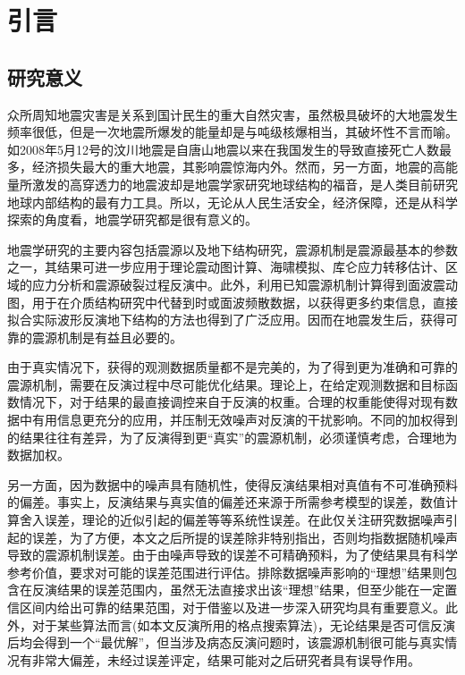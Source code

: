 \chapter{引言}

\section{研究意义}

众所周知地震灾害是关系到国计民生的重大自然灾害，虽然极具破坏的大地震发生频率很低，但是一次地震所爆发的能量却是与吨级核爆相当\citep{Stein2003}，其破坏性不言而喻。如2008年5月12号的汶川地震是自唐山地震以来在我国发生的导致直接死亡人数最多，经济损失最大的重大地震，其影响震惊海内外。然而，另一方面，地震的高能量所激发的高穿透力的地震波却是地震学家研究地球结构的福音，是人类目前研究地球内部结构的最有力工具。所以，无论从人民生活安全，经济保障，还是从科学探索的角度看，地震学研究都是很有意义的。

地震学研究的主要内容包括震源以及地下结构研究，震源机制是震源最基本的参数之一，其结果可进一步应用于理论震动图计算\citep{Wald2005}、海啸模拟\citep{Satake2007}、库仑应力转移估计\citep{King2007}、区域的应力分析和震源破裂过程反演中\citep{Kilb2001}。此外，利用已知震源机制计算得到面波震动图，用于在介质结构研究中代替到时或面波频散数据，以获得更多约束信息，直接拟合实际波形反演地下结构的方法也得到了广泛应用\citep{Nolet1990,Manaman2011,Friederich2003,Zielhuis1994,Cao2001,Lee1997}。因而在地震发生后，获得可靠的震源机制是有益且必要的。

由于真实情况下，获得的观测数据质量都不是完美的，为了得到更为准确和可靠的震源机制，需要在反演过程中尽可能优化结果。理论上，在给定观测数据和目标函数情况下，对于结果的最直接调控来自于反演的权重。合理的权重能使得对现有数据中有用信息更充分的应用，并压制无效噪声对反演的干扰影响。不同的加权得到的结果往往有差异，为了反演得到更“真实”的震源机制，必须谨慎考虑，合理地为数据加权。

另一方面，因为数据中的噪声具有随机性，使得反演结果相对真值有不可准确预料的偏差。事实上，反演结果与真实值的偏差还来源于所需参考模型的误差，数值计算舍入误差，理论的近似引起的偏差等等系统性误差。在此仅关注研究数据噪声引起的误差，为了方便，本文之后所提的误差除非特别指出，否则均指数据随机噪声导致的震源机制误差。由于由噪声导致的误差不可精确预料，为了使结果具有科学参考价值，要求对可能的误差范围进行评估。排除数据噪声影响的“理想”结果则包含在反演结果的误差范围内，虽然无法直接求出该“理想”结果，但至少能在一定置信区间内给出可靠的结果范围，对于借鉴以及进一步深入研究均具有重要意义。此外，对于某些算法而言(如本文反演所用的格点搜索算法)，无论结果是否可信反演后均会得到一个“最优解”，但当涉及病态反演问题时，该震源机制很可能与真实情况有非常大偏差，未经过误差评定，结果可能对之后研究者具有误导作用。

